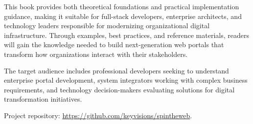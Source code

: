 This book provides both theoretical foundations and practical implementation guidance, making it suitable for full-stack developers, enterprise architects, and technology leaders responsible for modernizing organizational digital infrastructure. Through examples, best practices, and reference materials, readers will gain the knowledge needed to build next-generation web portals that transform how organizations interact with their stakeholders.

The target audience includes professional developers seeking to understand enterprise portal development, system integrators working with complex business requirements, and technology decision-makers evaluating solutions for digital transformation initiatives.

Project repository: \url{https://github.com/keyvisions/spintheweb}.

\clearpage
